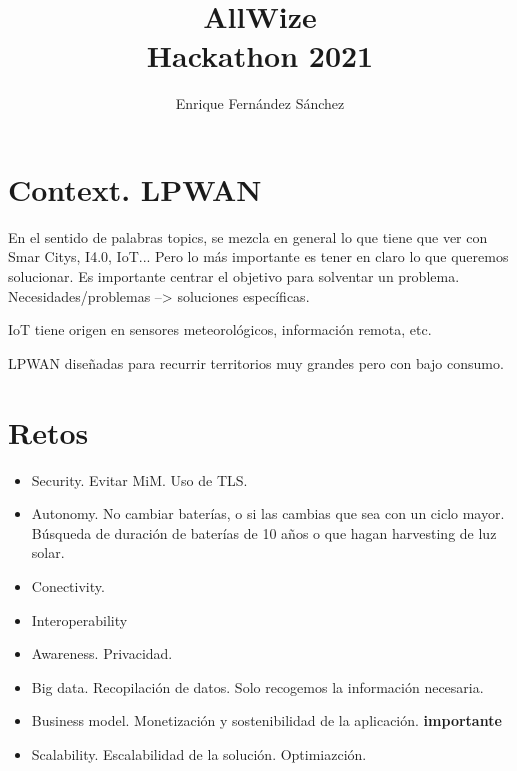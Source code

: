 \documentclass[12pt]{article}
\begin{document}
	\title{AllWize \\ \large Hackathon 2021}
	\author{Enrique Fernández Sánchez}
	
	
	\maketitle
	\tableofcontents
	
	\pagebreak
	
	\section{Context. LPWAN}
	\noindent En el sentido de palabras topics, se mezcla en general lo que tiene que ver con Smar Citys, I4.0, IoT... Pero lo más importante es tener en claro lo que queremos solucionar. Es importante centrar el objetivo para solventar un problema. Necesidades/problemas --> soluciones específicas.
	
	\noindent IoT tiene origen en sensores meteorológicos, información remota, etc.
	
	\noindent LPWAN diseñadas para recurrir territorios muy grandes pero con bajo consumo. 
	
	\section{Retos}
	\begin{itemize}
		\item Security. Evitar MiM. Uso de TLS. 
		\item Autonomy. No cambiar baterías, o si las cambias que sea con un ciclo mayor. Búsqueda de duración de baterías de 10 años o que hagan harvesting de luz solar.
		\item Conectivity.
		\item Interoperability
		\item Awareness. Privacidad.
		\item Big data. Recopilación de datos. Solo recogemos la información necesaria.
		\item Business model. Monetización y sostenibilidad de la aplicación. \textbf{importante}
		\item Scalability. Escalabilidad de la solución. Optimiazción.
	\end{itemize}
\end{document}
